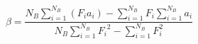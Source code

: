 \begin{displaymath}
\beta = \frac{N_B \sum_{i=1}^{N_B} (F_i a_i) - \sum_{i=1}^{N_B} F_i \sum_{i=1}^{N_B} a_i}{N_B \sum_{i=1}^{N_B} {F_i}^2 - \sum_{i=1}^{N_B} F_i^2}
\label{eq:linear_regression}
\end{displaymath}
